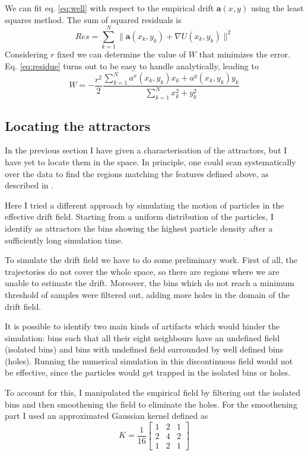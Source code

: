 \documentclass[a4paper]{article}
\begin{document}
We can fit eq. \ref{eq:well} with respect to the empirical drift $\bm{a}(x, y)$ using the least squares method. The sum of squared residuals is
\begin{equation} \label{eq:residue}
Res = \sum_{k = 1}^N \| \bm{a}(x_k, y_k) + \nabla U(x_k, y_k) \|^2
\end{equation}
Considering $r$ fixed we can determine the value of $W$ that minimizes the error. Eq. \ref{eq:residue} turns out to be easy to handle analytically, leading to
\begin{equation}
W = - \frac{r^2}{2} \frac{\sum_{k = 1}^N a^x(x_k, y_k) x_k + a^y(x_k, y_k) y_k}{\sum_{k = 1}^N x_k^2 + y_k^2}
\end{equation}

\subsection{Locating the attractors}
\label{sec:attractors}

In the previous section I have given a characterisation of the attractors, but I have yet to locate them in the space. In principle, one could scan systematically over the data to find the regions matching the features defined above, as described in \cite{hoze2012}.

Here I tried a different approach by simulating the motion of particles in the effective drift field. Starting from a uniform distribution of the particles, I identify as attractors the bins showing the highest particle density after a sufficiently long simulation time.

To simulate the drift field we have to do some preliminary work. First of all, the trajectories do not cover the whole space, so there are regions where we are unable to estimate the drift. Moreover, the bins which do not reach a minimum threshold of samples were filtered out, adding more holes in the domain of the drift field.

It is possible to identify two main kinds of artifacts which would hinder the simulation: bins such that all their eight neighbours have an undefined field (isolated bins) and bins with undefined field surrounded by well defined bins (holes). Running the numerical simulation in this discontinuous field would not be effective, since the particles would get trapped in the isolated bins or holes.

To account for this, I manipulated the empirical field by filtering out the isolated bins and then smoothening the field to eliminate the holes. For the smoothening part I used an approximated Gaussian kernel defined as
\begin{equation} \label{eq:kernel}
K = \frac{1}{16} \begin{bmatrix} 1 & 2 & 1 \\ 2 & 4 & 2 \\ 1 & 2 & 1\end{bmatrix}
\end{equation}
\end{document}
